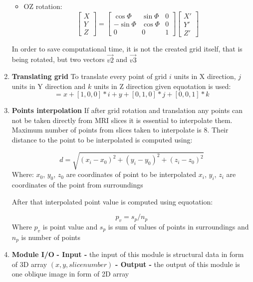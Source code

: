 \begin{enumerate}
\begin{itemize}
\item OZ rotation:
\begin{equation}
\left[ \begin{array}{c} X \\ Y \\Z \end{array} \right] = \begin{bmatrix} \cos\Phi & \sin\Phi & 0 \\ -\sin\Phi & \cos\Phi & 0 \\ 0 & 0 & 1 \end{bmatrix} \left[ \begin{array}{c} X' \\ Y' \\ Z' \end{array} \right] 
\end{equation}
\end{itemize}
\indent In order to save computational time, it is not the created grid itself, that is  being rotated, but two vectors $\vec{v2}$ and $\vec{v3}$

\item \textbf{Translating grid}
\newline\indent To translate every point of grid $i$ units in X direction, $j$ units in Y direction and $k$ units in Z direction given equotation is used:
\begin{equation}
[x,y,z] = x + [1,0,0]*i + y +[0,1,0]*j + [0,0,1]*k
\end{equation}

\item \textbf{Points interpolation}
\indent If after grid rotation and translation any points can not be taken directly from MRI slices it is essential to interpolate them. Maximum number of points from slices taken to interpolate is 8. Their distance to the point to be interpolated is computed using:

\begin{equation}
d = \sqrt{(x_i-x_0)^2+(y_i-y_0)^2+(z_i-z_0)^2}
\end{equation}
\indent Where:
\newline \indent$x_0$, $y_0$, $z_0$ are coordinates of point to be interpolated
\newline \indent$x_i$, $y_i$, $z_i$ are coordinates of the point from surroundings

\indent After that interpolated point value is computed using equotation:

\begin{equation}
p_v = s_p/n_p 
\end{equation}
\indent Where $p_v$ is point value and $s_p$ is sum of values of points in surroundings and $n_p$ is number of points

\item \textbf{Module I/O}
\newline\textbf{- Input -} the input of this module is structural data in form of 3D array $(x,y,slicenumber)$
\newline\textbf{- Output -} the output of this module is one oblique image in form of 2D array

\end{enumerate}
